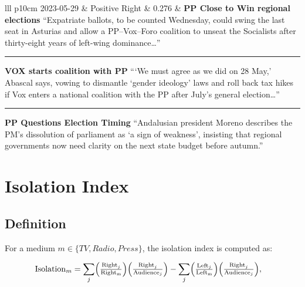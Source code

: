 \documentclass[12pt]{article}
\begin{document}
\begin{center}
\begin{longtable}{lll p{10cm}}
			2023-05-29 & Positive Right & 0.276 &
			\textbf{PP Close to Win regional elections}\newline
			{\scriptsize“Expatriate ballots, to be counted Wednesday, could swing the last seat in Asturias and allow a PP–Vox–Foro coalition to unseat the Socialists after thirty-eight years of left-wing dominance…”}\par\noindent\rule{\linewidth}{0.4pt}\par
			\textbf{VOX starts coalition with PP}\newline
			{\scriptsize“‘We must agree as we did on 28 May,’ Abascal says, vowing to dismantle ‘gender ideology’ laws and roll back tax hikes if Vox enters a national coalition with the PP after July’s general election…”}\par\noindent\rule{\linewidth}{0.4pt}\par
			\textbf{PP Questions Election Timing}\newline
			{\scriptsize“Andalusian president Moreno describes the PM’s dissolution of parliament as ‘a sign of weakness’, insisting that regional governments now need clarity on the next state budget before autumn.”} \\
			\hline
				\caption*{\small \textit{Note:} The table shows days with highest increase in news production between midday and night editions for each content type together with the stories of that type that appeared on  EFE between the two editions.}
			\label{tab:within}
		\end{longtable}
	\end{center}
	
	
	
	


\newpage



\section{Isolation Index }
\label{sec:isolation}

\subsection{Definition}

For a medium $m\in \{TV,Radio,Press\}$, the isolation index is computed as:


\begin{equation}\label{eq:isolation}
	\begin{aligned}
		& \mathrm{Isolation}_m=%
		\sum_{j}
		\Bigl(\tfrac{\mathrm{Right}_j}{\mathrm{Right_m}}\Bigr)
		\Bigl(\tfrac{\mathrm{Right}_j}{\mathrm{Audience}_j}\Bigr)
		-
		\sum_{j}
		\Bigl(\tfrac{\mathrm{Left}_j}{\mathrm{Left_m}}\Bigr)
		\Bigl(\tfrac{\mathrm{Right}_j}{\mathrm{Audience}_j}\Bigr),
	\end{aligned}
\end{equation} 
\end{document}

